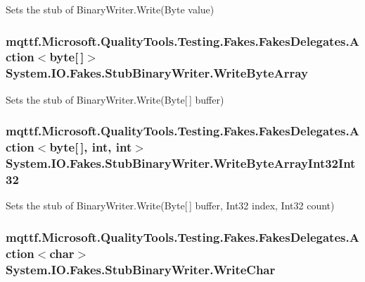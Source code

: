 Sets the stub of Binary\-Writer.\-Write(\-Byte value)

\hypertarget{class_system_1_1_i_o_1_1_fakes_1_1_stub_binary_writer_a9569684b1570c5476afa76fafe81e814}{
\subsubsection[{Write\-Byte\-Array}]{\setlength{\rightskip}{0pt plus 5cm}mqttf.\-Microsoft.\-Quality\-Tools.\-Testing.\-Fakes.\-Fakes\-Delegates.\-Action$<$byte\mbox{[}$\,$\mbox{]}$>$ System.\-I\-O.\-Fakes.\-Stub\-Binary\-Writer.\-Write\-Byte\-Array}}\label{class_system_1_1_i_o_1_1_fakes_1_1_stub_binary_writer_a9569684b1570c5476afa76fafe81e814}


Sets the stub of Binary\-Writer.\-Write(\-Byte\mbox{[}$\,$\mbox{]} buffer)

\hypertarget{class_system_1_1_i_o_1_1_fakes_1_1_stub_binary_writer_abaef3605910c758447fb80a0236db890}{
\subsubsection[{Write\-Byte\-Array\-Int32\-Int32}]{\setlength{\rightskip}{0pt plus 5cm}mqttf.\-Microsoft.\-Quality\-Tools.\-Testing.\-Fakes.\-Fakes\-Delegates.\-Action$<$byte\mbox{[}$\,$\mbox{]}, int, int$>$ System.\-I\-O.\-Fakes.\-Stub\-Binary\-Writer.\-Write\-Byte\-Array\-Int32\-Int32}}\label{class_system_1_1_i_o_1_1_fakes_1_1_stub_binary_writer_abaef3605910c758447fb80a0236db890}


Sets the stub of Binary\-Writer.\-Write(\-Byte\mbox{[}$\,$\mbox{]} buffer, Int32 index, Int32 count)

\hypertarget{class_system_1_1_i_o_1_1_fakes_1_1_stub_binary_writer_ac019f0cb3791f9107fcf800ea7a8490e}{
\subsubsection[{Write\-Char}]{\setlength{\rightskip}{0pt plus 5cm}mqttf.\-Microsoft.\-Quality\-Tools.\-Testing.\-Fakes.\-Fakes\-Delegates.\-Action$<$char$>$ System.\-I\-O.\-Fakes.\-Stub\-Binary\-Writer.\-Write\-Char}}\label{class_system_1_1_i_o_1_1_fakes_1_1_stub_binary_writer_ac019f0cb3791f9107fcf800ea7a8490e}


